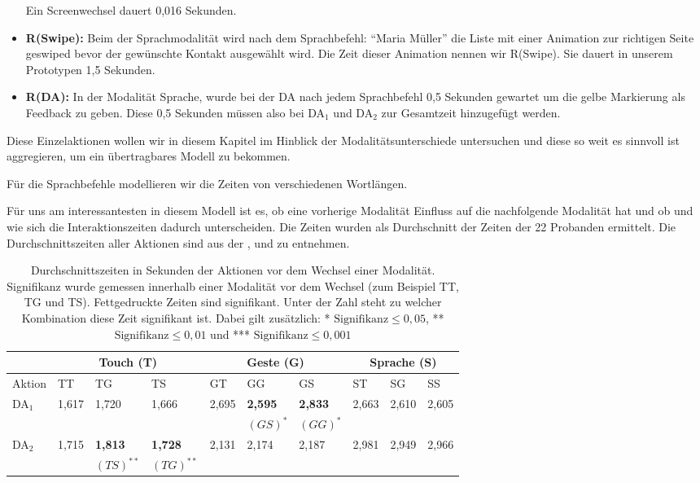 \begin{itemize}
	Ein Screenwechsel dauert 0,016 Sekunden.
	\item \textbf{R(Swipe):} Beim der Sprachmodalität wird nach dem Sprachbefehl: "`Maria Müller"' die Liste mit einer Animation zur richtigen Seite geswiped bevor der gewünschte Kontakt ausgewählt wird. Die Zeit dieser Animation nennen wir R(Swipe). Sie dauert in unserem Prototypen 1,5 Sekunden.
	\item \textbf{R(DA):} In der Modalität Sprache, wurde bei der DA nach jedem Sprachbefehl 0,5 Sekunden gewartet um die gelbe Markierung als Feedback zu geben. Diese 0,5 Sekunden müssen also bei DA$_1$ und DA$_2$ zur Gesamtzeit hinzugefügt werden.
\end{itemize}
Diese Einzelaktionen wollen wir in diesem Kapitel im Hinblick der Modalitätsunterschiede untersuchen und diese so weit es sinnvoll ist aggregieren, um ein übertragbares Modell zu bekommen.

Für die Sprachbefehle modellieren wir die Zeiten von verschiedenen Wortlängen.

Für uns am interessantesten in diesem Modell ist es, ob eine vorherige Modalität Einfluss auf die nachfolgende Modalität hat und ob und wie sich die Interaktionszeiten dadurch unterscheiden.
Die Zeiten wurden als Durchschnitt der Zeiten der 22 Probanden ermittelt.
Die Durchschnittszeiten aller Aktionen sind aus der ,  und  zu entnehmen.
\begin{table}[ht]
  \centering
	\begin{tabular}{|l|l|l|l|l|l|l|l|l|l|}
		\hline
		& \multicolumn{3}{|c|}{Touch (T)} & \multicolumn{3}{|c|}{Geste (G)}&\multicolumn{3}{|c|}{Sprache (S)}\\
		\hline
		Aktion 					& TT 		& TG 		& TS 		& GT 		& GG 		& GS 		& ST 		& SG 		& SS\\
		\hline
		DA$_1$ 	& 1,617 & 1,720	& 1,666 &	2,695	&	\textbf{2,595}	&	\textbf{2,833}	&	2,663	& 2,610	& 2,605\\
					&  			&  			&				&				&		\small{$(GS)^*$}					&	\small{$(GG)^*$}			 			&		&	& \\
		\hline
		DA$_2$ 	& 1,715 & \textbf{1,813}	& \textbf{1,728}	&	2,131	&	2,174	&	2,187	&	2,981	&	2,949	& 2,966\\
					&  			& \small{$(TS)^{**}$}				&	\small{$(TG)^{**}$}			&				&				&				&		&	& \\
		\hline
  \end{tabular}
	\caption[Durchschnittszeiten der Aktionen vor dem Wechsel einer Modalität]{Durchschnittszeiten in Sekunden der Aktionen vor dem Wechsel einer Modalität. Signifikanz wurde gemessen innerhalb einer Modalität vor dem Wechsel (zum Beispiel TT, TG und TS). Fettgedruckte Zeiten sind signifikant. Unter der Zahl steht zu welcher Kombination diese Zeit signifikant ist. Dabei gilt zusätzlich: * $\text{Signifikanz} \leq 0,05$, ** $\text{Signifikanz} \leq 0,01$ und *** $\text{Signifikanz} \leq 0,001$}
\label{tab:OperatorzeitenVorWechsel1}
\end{table}

